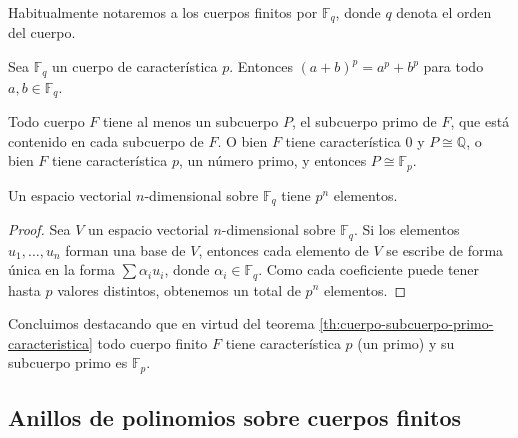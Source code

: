 Habitualmente notaremos a los cuerpos finitos por \(\mathbb F_q\), donde \(q\) denota el orden del cuerpo.

\begin{proposition}
  \label{prop:freshmans-dream}
  Sea \(\mathbb F_q\) un cuerpo de característica \(p\).
  Entonces \((a + b)^{p} = a^{p} + b^{p}\) para todo \(a, b \in \mathbb F_q\).
\end{proposition}

\begin{theorem}
  \label{th:cuerpo-subcuerpo-primo-caracteristica}
  Todo cuerpo \(F\) tiene al menos un subcuerpo \(P\), el subcuerpo primo de \(F\), que está contenido en cada subcuerpo de \(F\).
  O bien \(F\) tiene característica \(0\) y \(P \cong \mathbb Q\), o bien \(F\) tiene característica \(p\), un número primo, y entonces \(P \cong \mathbb F_p\).
\end{theorem}

\begin{lemma}
  Un espacio vectorial \(n\)-dimensional sobre \(\mathbb F_q\) tiene \(p^n\) elementos.
\end{lemma}

\begin{proof}
  Sea \(V\) un espacio vectorial \(n\)-dimensional sobre \(\mathbb F_q\).
  Si los elementos \(u_1, \dots, u_n\) forman una base de \(V\), entonces cada elemento de \(V\) se escribe de forma única en la forma \(\sum \alpha_iu_i\), donde \(\alpha_i \in \mathbb F_q\).
  Como cada coeficiente puede tener hasta \(p\) valores distintos, obtenemos un total de \(p^n\) elementos.
\end{proof}

Concluimos destacando que en virtud del teorema \ref{th:cuerpo-subcuerpo-primo-caracteristica} todo cuerpo finito \(F\) tiene característica \(p\) (un primo) y su subcuerpo primo es \(\mathbb F_p\).

\subsection{Anillos de polinomios sobre cuerpos finitos}

